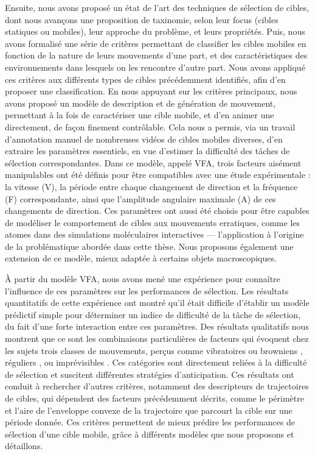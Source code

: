 	Ensuite, nous avons proposé un état de l'art des techniques de sélection de cibles, dont nous avançons une proposition de taxinomie, selon leur focus (cibles statiques ou mobiles), leur approche du problème, et leurs propriétés. Puis, nous avons formalisé une série de critères permettant de classifier les cibles mobiles en fonction de la nature de leurs mouvements d'une part, et des caractéristiques des environnements dans lesquels on les rencontre d'autre part. Nous avons appliqué ces critères aux différents types de cibles précédemment identifiés, afin d'en proposer une classification. En nous appuyant sur les critères principaux, nous avons proposé un modèle de description et de génération de mouvement, permettant à la fois de caractériser une cible mobile, et d'en animer une directement, de façon finement contrôlable. Cela nous a permis, via un travail d'annotation manuel de nombreuses vidéos de cibles mobiles diverses, d'en extraire les paramètres essentiels, en vue d'estimer la difficulté des tâches de sélection correspondantes. Dans ce modèle, appelé VFA, trois facteurs aisément manipulables ont été définis pour être compatibles avec une étude expérimentale : la vitesse (V), la période entre chaque changement de direction et la fréquence (F) correspondante, ainsi que l'amplitude angulaire maximale (A) de ces changements de direction. Ces paramètres ont aussi été choisis pour être capables de modéliser le comportement de cibles aux mouvements erratiques, comme les atomes dans des simulations moléculaires interactives --- l’application à l’origine de la problématique abordée dans cette thèse. Nous proposons également une extension de ce modèle, mieux adaptée à certains objets macroscopiques.

	À partir du modèle VFA, nous avons mené une expérience pour connaître l'influence de ces paramètres sur les performances de sélection. Les résultats quantitatifs de cette expérience ont montré qu'il était difficile d'établir un modèle prédictif simple pour déterminer un indice de difficulté de la tâche de sélection, du fait d'une forte interaction entre ces paramètres. Des résultats qualitatifs nous montrent que ce sont les combinaisons particulières de facteurs qui évoquent chez les sujets trois classes de mouvements, perçus comme \og vibratoires \fg{} ou \og browniens \fg{}, \og réguliers \fg{}, ou \og imprévisibles \fg{}. Ces catégories sont directement reliées à la difficulté de sélection et suscitent différentes stratégies d'anticipation. Ces résultats ont conduit à rechercher d'autres critères, notamment des descripteurs de trajectoires de cibles, qui dépendent des facteurs précédemment décrits, comme le périmètre et l'aire de l'enveloppe convexe de la trajectoire que parcourt la cible sur une période donnée. Ces critères permettent de mieux prédire les performances de sélection d'une cible mobile, grâce à différents modèles que nous proposons et détaillons.


